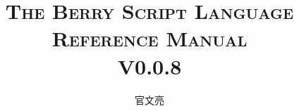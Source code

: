 
\newcommand\nbvspace[1][3]{\vspace*{\stretch{#1}}}
\newcommand\nbstretchyspace{\spaceskip0.5em plus 0.25em minus 0.25em}
\newcommand{\nbtitlestretch}{\spaceskip0.6em}

\newcommand{\cndash}{\raisebox{0.5mm}{------}}

\begin{titlepage}

    \title{\ebgaramond\Huge{\scshape The Berry Script Language\\Reference Manual}\\\Large{V0.0.8}}

    \author{官文亮}

    \maketitle

\end{titlepage}
